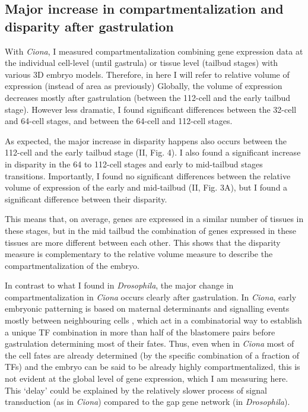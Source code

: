 \subsection{Major increase in compartmentalization and disparity after gastrulation}
With \textit{Ciona}, I measured compartmentalization combining gene expression data at the individual cell-level (until gastrula) or tissue level (tailbud stages) with various 3D embryo models.
Therefore, in here I will refer to relative volume of expression (instead of area as previously)
Globally, the volume of expression decreases mostly after gastrulation (between the 112-cell and the early tailbud stage).
However less dramatic, I found significant differences between the 32-cell and 64-cell stages, and between the 64-cell and 112-cell stages.

As expected, the major increase in disparity happens also occurs between the 112-cell and the early tailbud stage (II, Fig. 4).
I also found a significant increase in disparity in the 64 to 112-cell stages and early to mid-tailbud stages transitions.
Importantly, I found no significant differences between the relative volume of expression of the early and mid-tailbud (II, Fig. 3A), but I found a significant difference between their disparity.


This means that, on average, genes are expressed in a similar number of tissues in these stages, but in the mid tailbud the combination of genes expressed in these tissues are more different between each other. This shows that the disparity measure is complementary to the relative volume measure to describe the compartmentalization of the embryo.

In contrast to what I found in \textit{Drosophila}, the major change in compartmentalization in \textit{Ciona} occurs clearly after gastrulation.
In \textit{Ciona}, early embryonic patterning is based on maternal determinants and signalling events mostly between neighbouring cells \citep{Lemaire2009}, which act in a combinatorial way \citep{Hudson2007} to establish a unique TF combination in more than half of the blastomere pairs before gastrulation \citep{Imai2006} determining most of their fates.
Thus, even when in \textit{Ciona} most of the cell fates are already determined (by the specific combination of a fraction of TFs) and the embryo can be said to be already highly compartmentalized, this is not evident at the global level of gene expression, which I am measuring here.
This `delay' could be explained by the relatively slower process of signal transduction (as in \textit{Ciona}) compared to the gap gene network (in \textit{Drosophila}).

